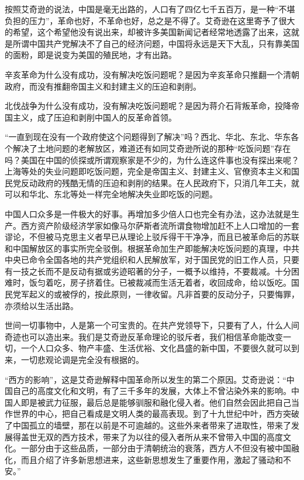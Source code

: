 按照艾奇逊的说法，中国是毫无出路的，人口有了四亿七千五百万，是一种“不堪负担的压力”，革命也好，不革命也好，总之是不得了。艾奇逊在这里寄予了很大的希望，这个希望他没有说出来，却被许多美国新闻记者经常地透露了出来，这就是所谓中国共产党解决不了自己的经济问题，中国将永远是天下大乱，只有靠美国的面粉，即是说变为美国的殖民地，才有出路。

辛亥革命为什么没有成功，没有解决吃饭问题呢？是因为辛亥革命只推翻一个清朝政府，而没有推翻帝国主义和封建主义的压迫和剥削。

北伐战争为什么没有成功，没有解决吃饭问题呢？是因为蒋介石背叛革命，投降帝国主义，成了压迫和剥削中国人的反革命首领。

“一直到现在没有一个政府使这个问题得到了解决”吗？西北、华北、东北、华东各个解决了土地问题的老解放区，难道还有如同艾奇逊所说的那种“吃饭问题”存在吗？美国在中国的侦探或所谓观察家是不少的，为什么连这件事也没有探出来呢？上海等处的失业问题即吃饭问题，完全是帝国主义、封建主义、官僚资本主义和国民党反动政府的残酷无情的压迫和剥削的结果。在人民政府下，只消几年工夫，就可以和华北、东北等处一样完全地解决失业即吃饭的问题。

中国人口众多是一件极大的好事。再增加多少倍人口也完全有办法，这办法就是生产。西方资产阶级经济学家如像马尔萨斯者流所谓食物增加赶不上人口增加的一套谬论，不但被马克思主义者早已从理论上驳斥得干干净净，而且已被革命后的苏联和中国解放区的事实所完全驳倒。根据革命加生产即能解决吃饭问题的真理，中共中央已命令全国各地的共产党组织和人民解放军，对于国民党的旧工作人员，只要有一技之长而不是反动有据或劣迹昭著的分子，一概予以维持，不要裁减。十分困难时，饭匀着吃，房子挤着住。已被裁减而生活无着者，收回成命，给以饭吃。国民党军起义的或被俘的，按此原则，一律收留。凡非首要的反动分子，只要悔罪，亦须给以生活出路。

世间一切事物中，人是第一个可宝贵的。在共产党领导下，只要有了人，什么人间奇迹也可以造出来。我们是艾奇逊反革命理论的驳斥者，我们相信革命能改变一切，一个人口众多、物产丰盛、生活优裕、文化昌盛的新中国，不要很久就可以到来，一切悲观论调是完全没有根据的。

“西方的影响”，这是艾奇逊解释中国革命所以发生的第二个原因。艾奇逊说：“中国自己的高度文化和文明，有了三千多年的发展，大体上不曾沾染外来的影响。中国人即是被武力征服，最后总是能够驯服和融化侵入者。他们自然会因此把自己当作世界的中心，把自己看成是文明人类的最高表现。到了十九世纪中叶，西方突破了中国孤立的墙壁，那在以前是不可逾越的。这些外来者带来了进取性，带来了发展得盖世无双的西方技术，带来了为以往的侵入者所从来不曾带入中国的高度文化。一部分由于这些品质，一部分由于清朝统治的衰落，西方人不但没有被中国融化，而且介绍了许多新思想进来，这些新思想发生了重要作用，激起了骚动和不安。”

